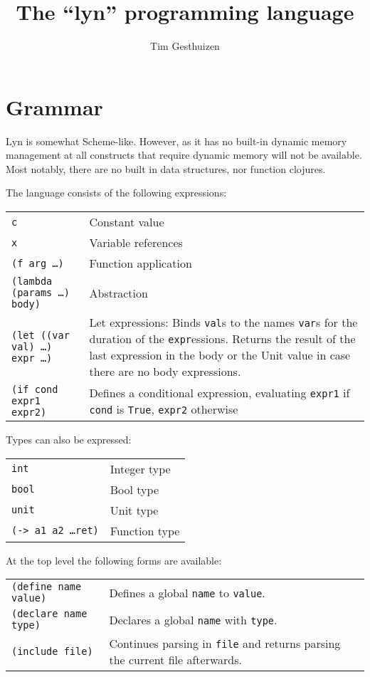 \documentclass[a4paper, 11pt]{article}
\title{The ``lyn'' programming language}
\author{Tim Gesthuizen}
\begin{document}
\maketitle

\section{Grammar}

Lyn is somewhat Scheme-like.
However, as it has no built-in dynamic memory management at all
constructs that require dynamic memory will not be available.
Most notably, there are no built in data structures, nor function
clojures.

The language consists of the following expressions:\\[1.5ex]
\begin{tabularx}{\linewidth}{lX}
  \texttt{c} & Constant value\\
  \texttt{x} & Variable references\\
  \texttt{(f arg \ldots)} & Function application\\
  \texttt{(lambda (params \ldots) body)} & Abstraction\\
  \texttt{(let ((var val) \ldots) expr \ldots)} & Let expressions:
  Binds \texttt{val}s to the names \texttt{var}s for the duration of
  the \texttt{expr}essions.
  Returns the result of the last expression in the body or the Unit
  value in case there are no body expressions.\\
  \texttt{(if cond expr1 expr2)} & Defines a conditional
  expression, evaluating \texttt{expr1} if \texttt{cond} is
  \texttt{True}, \texttt{expr2} otherwise\\
\end{tabularx}

Types can also be expressed:\\[1.5ex]
\begin{tabularx}{\linewidth}{lX}
  \texttt{int}& Integer type\\
  \texttt{bool}& Bool type\\
  \texttt{unit}& Unit type\\
  \texttt{(-> a1 a2 \ldots ret)} & Function type\\
\end{tabularx}

At the top level the following forms are available:\\[1.5ex]
\begin{tabularx}{\linewidth}{lX}
  \texttt{(define name value)} & Defines a global \texttt{name} to
                                 \texttt{value}.\\
  \texttt{(declare name type)} & Declares a global \texttt{name} with
                                 \texttt{type}.\\
  \texttt{(include file)} & Continues parsing in \texttt{file} and
                            returns parsing the current file
                            afterwards.\\
\end{tabularx}
\end{document}

